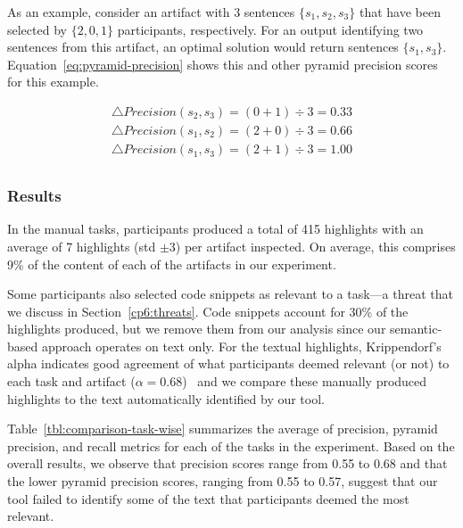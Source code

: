 As an example, consider an artifact with 3 sentences $\{s_1, s_2, s_3\}$ that have been selected by $\{2, 0, 1\}$ participants, respectively.
For an output identifying two sentences from this artifact, an optimal solution would return sentences $\{s_1, s_3\}$. 
Equation~\ref{eq:pyramid-precision} shows this and other pyramid precision scores for this example.



\begin{small}
\begin{equation}
\begin{split}
\triangle  Precision(s_2, s_3) = ( 0 + 1) \div 3 =  0.33 \\
\triangle  Precision(s_1, s_2) = ( 2 + 0) \div 3 =  0.66 \\
\triangle  Precision(s_1, s_3) =  ( 2 + 1) \div 3 =  1.00 \\
\label{eq:pyramid-precision}
\end{split}
\end{equation}
\end{small}





\subsubsection{Results}



In the manual tasks, participants produced a total of 415 highlights with an average of 7 highlights (std $\pm 3$) per artifact inspected.
On average, this comprises 9\% of the content of each of the artifacts in our experiment. 


Some participants also selected code snippets as relevant to a task---a threat that we discuss in Section~\ref{cp6:threats}. 
Code snippets account for 30\% of the highlights produced, but we remove them from our analysis since our semantic-based approach 
operates on text only. For the textual highlights,
Krippendorf's alpha indicates good agreement of what participants deemed relevant (or not) to each task and artifact ($\alpha = 0.68$)~\cite{Krippendorff1980, passonneau2006}
and we compare these manually produced highlights to the text automatically identified by our tool.



Table~\ref{tbl:comparison-task-wise} summarizes the average of precision, pyramid precision, and recall metrics for each of the tasks in the experiment.
Based on the overall results, we observe that precision scores range from 0.55 to 0.68 and that 
the lower pyramid precision scores, ranging from 0.55 to 0.57, suggest that our tool failed to identify some of the text that participants deemed the most relevant.


